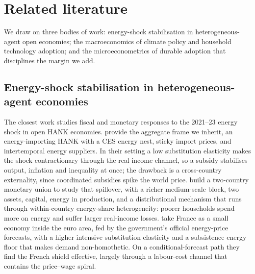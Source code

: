 %

\section{Related literature}\label{sec:lit}

We draw on three bodies of work: energy-shock stabilisation in heterogeneous-agent
open economies; the macroeconomics of climate policy and household technology
adoption; and the microeconometrics of durable adoption that disciplines the margin
we add.

\subsection{Energy-shock stabilisation in heterogeneous-agent economies}

The closest work studies fiscal and monetary responses to the 2021--23 energy shock
in open HANK economies. \citet{auclert2023energy} provide the aggregate frame we inherit, an
energy-importing HANK with a CES energy nest, sticky import prices, and
intertemporal energy suppliers. In their setting a low substitution elasticity
makes the shock contractionary through the real-income channel, so a subsidy
stabilises output, inflation and inequality at once; the drawback is a
cross-country externality, since coordinated subsidies spike the world price.
\citet{bayer2026hank} build a two-country monetary union to study that
spillover, with a richer medium-scale block, two assets, capital, energy in
production, and a distributional mechanism that runs through within-country
energy-share heterogeneity: poorer households spend more on energy and suffer larger
real-income losses. \citet{langot2026tariff} take France as a small economy inside the
euro area, fed by the government's official energy-price forecasts, with a higher
intensive substitution elasticity and a subsistence energy floor that makes demand
non-homothetic. On a conditional-forecast path they find the French shield
effective, largely through a labour-cost channel that contains the price--wage
spiral.

